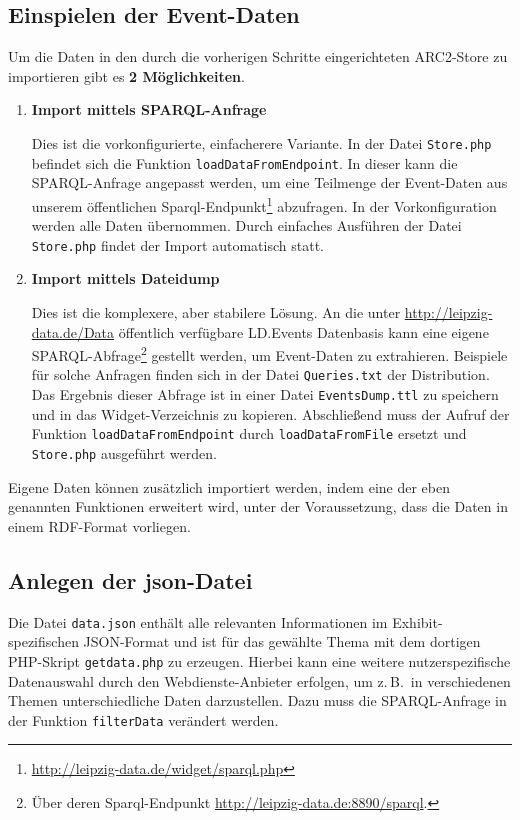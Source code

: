 \documentclass[11pt,a4paper]{article}
\begin{document}
\subsection{Einspielen der Event-Daten}
Um die Daten in den durch die vorherigen Schritte eingerichteten ARC2-Store zu
importieren gibt es \textbf{2 Möglichkeiten}.
\begin{enumerate}
\item \textbf{Import mittels SPARQL-Anfrage}

  Dies ist die vorkonfigurierte, einfacherere Variante. In der Datei
  \texttt{Store.php} befindet sich die Funktion \texttt{loadDataFromEndpoint}.
  In dieser kann die SPARQL-Anfrage angepasst werden, um eine Teilmenge der
  Event-Daten aus unserem öffentlichen
  Sparql-Endpunkt\footnote{\url{http://leipzig-data.de/widget/sparql.php}}
  abzufragen. In der Vorkonfiguration werden alle Daten übernommen. Durch
  einfaches Ausführen der Datei \texttt{Store.php} findet der Import
  automatisch statt.

\item \textbf{Import mittels Dateidump}

Dies ist die komplexere, aber stabilere Lösung.  An die unter
\url{http://leipzig-data.de/Data} öffentlich verfügbare LD.Events Datenbasis
kann eine eigene SPARQL-Abfrage\footnote{Über deren Sparql-Endpunkt
  \url{http://leipzig-data.de:8890/sparql}.} gestellt werden, um Event-Daten
zu extrahieren.  Beispiele für solche Anfragen finden sich in der Datei
\texttt{Queries.txt} der Distribution.  Das Ergebnis dieser Abfrage ist in
einer Datei \texttt{EventsDump.ttl} zu speichern und in das Widget-Verzeichnis
zu kopieren. Abschließend muss der Aufruf der Funktion
\texttt{loadDataFromEndpoint} durch \texttt{loadDataFromFile} ersetzt und
\texttt{Store.php} ausgeführt werden.
\end{enumerate}
Eigene Daten können zusätzlich importiert werden, indem eine der eben
genannten Funktionen erweitert wird, unter der Voraussetzung, dass die Daten
in einem RDF-Format vorliegen.

\subsection{Anlegen der json-Datei}

Die Datei \texttt{data.json} enthält alle relevanten Informationen im
Exhibit-spezifischen JSON-Format und ist für das gewählte Thema mit dem
dortigen PHP-Skript \texttt{getdata.php} zu erzeugen.  Hierbei kann eine
weitere nutzerspezifische Datenauswahl durch den Webdienste-Anbieter erfolgen,
um z.\,B.\ in verschiedenen Themen unterschiedliche Daten darzustellen. Dazu
muss die SPARQL-Anfrage in der Funktion \texttt{filterData} verändert werden.
\end{document}
